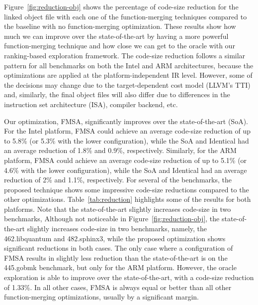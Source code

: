 Figure~\ref{fig:reduction-obj} shows the
percentage of code-size reduction for the linked object file with each one of
the function-merging techniques compared to the baseline with no
function-merging optimization.
These results show how much we can improve over the state-of-the-art by having
a more powerful function-merging technique and how close we can get to the
oracle with our ranking-based exploration framework.
The code-size reduction follows a similar pattern for all benchmarks on both
the Intel and ARM architectures, because the optimizations are applied at the
platform-independent IR level.
However, some of the decisions may change due to the target-dependent cost model
(LLVM's TTI) and, similarly, the final object files will also differ due to
differences in the instruction set architecture (ISA), compiler backend, etc.
 

Our optimization, FMSA, significantly improves over the state-of-the-art (SoA).
For the Intel platform, FMSA could achieve an average code-size reduction of up
to 5.8\% (or 5.3\% with the lower configuration), while the SoA and Identical
had an average reduction of 1.8\% and 0.9\%, respectively. 
Similarly, for the ARM platform, FMSA could achieve an average code-size
reduction of up to 5.1\% (or 4.6\% with the lower configuration), while the SoA
and Identical had an average reduction of 2\% and 1.1\%, respectively. 
For several of the benchmarks, the proposed technique shows some impressive
code-size reductions compared to the other optimizations.
Table~\ref{tab:reduction} highlights some of the results for both platforms.
Note that the state-of-the-art slightly increases code-size in two benchmarks,
Although not noticeable in Figure~\ref{fig:reduction-obj}, the state-of-the-art
slightly increases code-size in two benchmarks, namely, the 462.libquantum and
482.sphinx3, while the proposed optimization shows significant reductions in
both cases.
The only case where a configuration of FMSA results in slightly less reduction
than the state-of-the-art is on the 445.gobmk benchmark, but only for the ARM
platform.
However, the oracle exploration is able to improve over the state-of-the-art,
with a code-size reduction of 1.33\%.
In all other cases, FMSA is always equal or better than all other
function-merging optimizations, usually by a significant margin.

